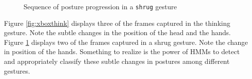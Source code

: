 \documentclass[]{report}   %
\begin{document}
\begin{figure}[htbp]
  \centering
  \hfill
  \hfill
  \caption{Sequence of posture progression in a \texttt{shrug} gesture}
  \label{fig:xboxshrug}
\end{figure}
Figure \ref{fig:xboxthink} displays three of the frames captured in the thinking gesture. Note the subtle changes in the position of the head and the hands. Figure \ref{fig:xboxshrug} displays two of the frames captured in a shrug gesture. Note the change in position of the hands. Something to realize is the power of HMMs to detect and appropriately classify these subtle changes in postures among different gestures.
\end{document}
